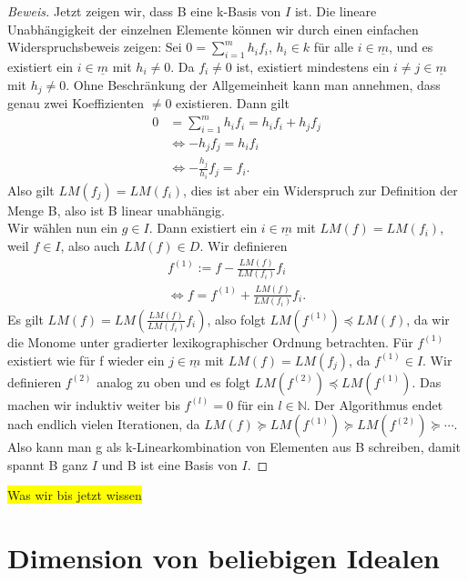 \documentclass{article}
\begin{document}
\begin{proof}[Beweis]
	Jetzt zeigen wir, dass B eine k-Basis von \(I\) ist. Die lineare Unabhängigkeit der einzelnen 
	Elemente können wir durch einen einfachen Widerspruchsbeweis zeigen:
	Sei \(0 = \sum_{i=1}^{m} h_{i}f_{i}\), \(h_{i} \in k\) für alle \(i \in \underline{m}\),
	und es existiert ein \(i \in \underline{m}\) mit \(h_{i} \neq 0\).
	Da \(f_{i} \neq 0\) ist, existiert mindestens ein \(i \neq j \in \underline
	{m}\) mit \(h_{j} \neq 0\). Ohne Beschränkung der Allgemeinheit kann man annehmen, dass genau
	zwei Koeffizienten \(\neq 0\) existieren. Dann gilt
	\begin{align*}
		0 &= \sum_{i=1}^{m} h_{i}f_{i} = h_{i}f_{i} + h_{j}f_{j} \\
		&\Leftrightarrow -h_{j}f_{j} = h_{i}f_{i} \\
		&\Leftrightarrow -\frac{h_{j}}{h_{i}} f_{j} = f_{i}.
	\end{align*}
	Also gilt \(LM(f_{j}) = LM(f_{i})\), dies ist aber ein Widerspruch zur Definition der Menge B,
	also ist B linear unabhängig. \\
	Wir wählen nun ein \(g \in I\). Dann existiert ein \(i \in \underline{m}\) mit \(LM(f) =
	LM(f_{i})\), weil \(f \in I\), also auch \(LM(f) \in D\). Wir definieren
	\begin{align*}
		f^{(1)} := f - \frac{LM(f)}{LM(f_{i})}f_{i} \\
		\Leftrightarrow f = f^{(1)} + \frac{LM(f)}{LM(f_{i})}f_{i}.
	\end{align*}
	Es gilt \(LM(f) = LM(\frac{LM(f)}{LM(f_{i})}f_{i})\), also folgt \(LM(f^{(1)}) \preceq LM(f)\),
	da wir die Monome unter gradierter lexikographischer Ordnung betrachten.
	Für \(f^{(1)}\) existiert wie für f wieder ein \(j \in \underline{m}\) mit \(LM(f) =
	LM(f_{j})\), da \(f^{(1)} \in I\). Wir definieren \(f^{(2)}\) analog zu oben und es
	folgt \(LM(f^{(2)}) \preceq LM(f^{(1)})\). Das machen wir induktiv weiter bis \(f^{(l)} = 0\)  
	für ein \(l \in \mathbb{N}\).
	Der Algorithmus endet nach endlich vielen Iterationen, da \(LM(f) \succeq LM(f^{(1)}) \succeq LM(f^{(2)}) \succeq \cdots\).
	Also kann man g als k-Linearkombination von Elementen aus B schreiben, damit spannt B ganz \(I\) und B ist eine Basis von \(I\).
	\end{proof}

	
	\colorbox{yellow}{Was wir bis jetzt wissen}


\section{Dimension von beliebigen Idealen}
\end{document}
